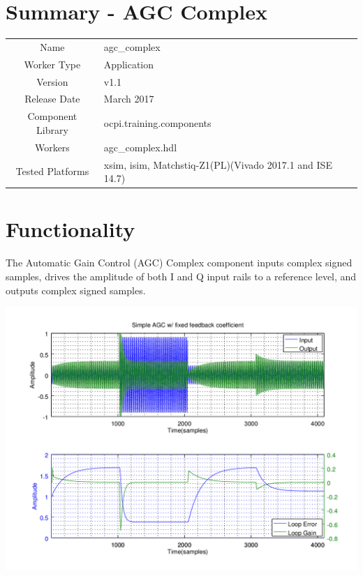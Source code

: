 \documentclass{article}
\author{} %
\date{Version \docVersion} %
\title{\docTitle}
\def\comp{agc\_complex}
\def\Comp{AGC Complex}
\begin{document}
\section*{Summary - \Comp}
\begin{tabular}{|c|M{13.5cm}|}
	\hline
	                  &                                                              \\
	\hline
	Name              & \comp                                                        \\
	\hline
	Worker Type       & Application                                                  \\
	\hline
	Version           & v1.1                                                         \\
	\hline
	Release Date      & March 2017                                                   \\
	\hline
	Component Library & ocpi.training.components                                             \\
	\hline
	Workers           & \comp.hdl                                                    \\
	\hline
	Tested Platforms  & xsim, isim, Matchstiq-Z1(PL)(Vivado 2017.1 and ISE 14.7) \\
	\hline
\end{tabular}

\section*{Functionality}
\begin{flushleft}
	The Automatic Gain Control (AGC) Complex component inputs complex signed samples, drives the amplitude of both I and Q input rails to a reference level, and outputs complex signed samples.
\end{flushleft}

	{\centering\captionsetup{type=figure}\includegraphics[scale=0.5]{agc_matlab}\par{}\label{fig:ideal}}
\end{document}
